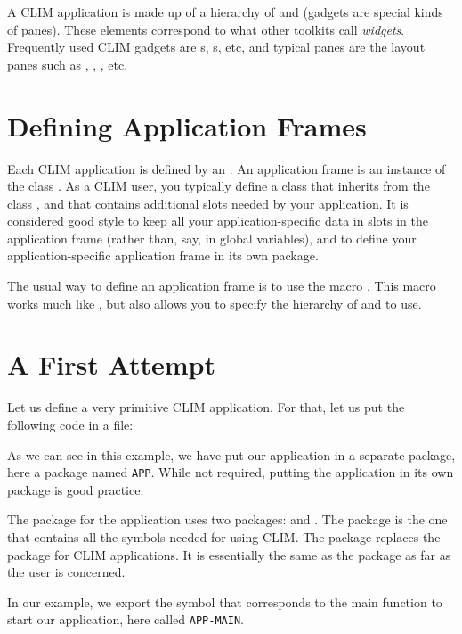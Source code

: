A CLIM application is made up of a hierarchy of  and
 (gadgets are special kinds of panes).  These elements
correspond to what other toolkits call \emph{widgets}.  Frequently used
CLIM gadgets are s, s, etc, and typical
panes are the layout panes such as , ,
, etc.

\section{Defining Application Frames}

Each CLIM application is defined by an .  An
application frame is an instance of the class .
As a CLIM user, you typically define a class that inherits from the
class , and that contains additional slots
needed by your application.  It is considered good style to keep all
your application-specific data in slots in the application frame (rather
than, say, in global variables), and to define your application-specific
application frame in its own package.

The usual way to define an application frame is to use the macro
.  This macro works much like
, but also allows you to specify the hierarchy of
 and  to use.

\section{A First Attempt}

Let us define a very primitive CLIM application.  For that, let us put
the following code in a file:



As we can see in this example, we have put our application in a separate
package, here a package named \texttt{APP}.  While not required, putting the
application in its own package is good practice.

The package for the application uses two packages:  and
.  The  package is the one that
contains all the symbols needed for using CLIM.  The 
package replaces the  package for CLIM
applications.  It is essentially the same as the 
package as far as the user is concerned.

In our example, we export the symbol that corresponds to the main
function to start our application, here called \texttt{APP-MAIN}.

